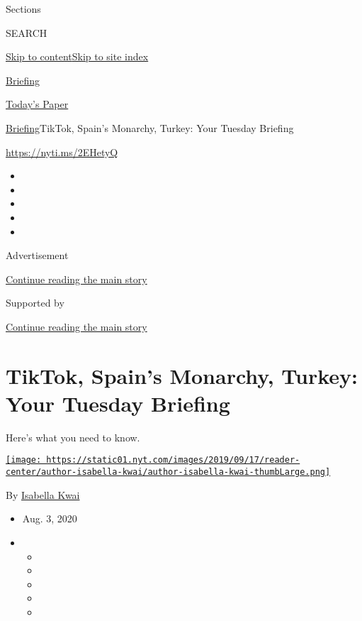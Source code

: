 Sections

SEARCH

\protect\hyperlink{site-content}{Skip to
content}\protect\hyperlink{site-index}{Skip to site index}

\href{https://www.nytimes.com/interactive/2018/briefing/global-morning-briefing-newsletter-signup.html}{Briefing}

\href{https://myaccount.nytimes.com/auth/login?response_type=cookie\&client_id=vi}{}

\href{https://www.nytimes.com/section/todayspaper}{Today's Paper}

\href{/interactive/2018/briefing/global-morning-briefing-newsletter-signup.html}{Briefing}\textbar{}TikTok,
Spain's Monarchy, Turkey: Your Tuesday Briefing

\url{https://nyti.ms/2EHetyQ}

\begin{itemize}
\item
\item
\item
\item
\item
\end{itemize}

Advertisement

\protect\hyperlink{after-top}{Continue reading the main story}

Supported by

\protect\hyperlink{after-sponsor}{Continue reading the main story}

\hypertarget{tiktok-spains-monarchy-turkey-your-tuesday-briefing}{%
\section{TikTok, Spain's Monarchy, Turkey: Your Tuesday
Briefing}\label{tiktok-spains-monarchy-turkey-your-tuesday-briefing}}

Here's what you need to know.

\href{https://www.nytimes.com/by/isabella-kwai}{\texttt{[image: https://static01.nyt.com/images/2019/09/17/reader-center/author-isabella-kwai/author-isabella-kwai-thumbLarge.png]}}

By \href{https://www.nytimes.com/by/isabella-kwai}{Isabella Kwai}

\begin{itemize}
\item
  Aug. 3, 2020
\item
  \begin{itemize}
  \item
  \item
  \item
  \item
  \item
  \end{itemize}
\end{itemize}

